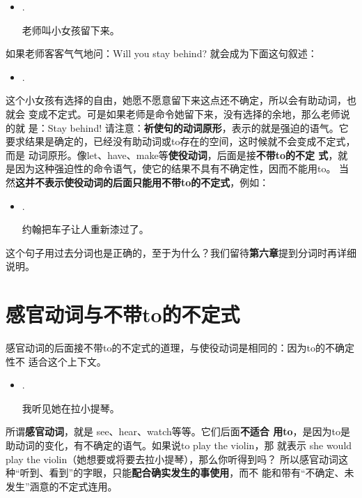 \begin{itemize}
\item  {}   .

  老师叫小女孩留下来。
\end{itemize}

如果老师客客气气地问：Will you stay behind? 就会成为下面这句叙述：
\begin{itemize}
\item {}   .
\end{itemize}
这个小女孩有选择的自由，她愿不愿意留下来这点还不确定，所以会有助动词，也就会
变成不定式。可是如果老师是命令她留下来，没有选择的余地，那么老师说的就
是：Stay behind! 请注意：\textbf{祈使句的动词原形}，表示的就是强迫的语气。它
要求结果是确定的，已经没有助动词或to存在的空间，这时候就不会变成不定式，而是
动词原形。像let、have、make等\textbf{使役动词}，后面是接\textbf{不带to的不定
  式}，就是因为这种强迫性的命令语气，使它的结果不具有不确定性，因而不能用to。
当然\textbf{这并不表示使役动词的后面只能用不带to的不定式}，例如：
\begin{itemize}
\item {}   .

  约翰把车子让人重新漆过了。
\end{itemize}
这个句子用过去分词也是正确的，至于为什么？我们留待\textbf{第六章}提到分词时再详细说明。

\section{感官动词与不带to的不定式}

感官动词的后面接不带to的不定式的道理，与使役动词是相同的：因为to的不确定性不
适合这个上下文。

\begin{itemize}
\item {}   .

  我听见她在拉小提琴。
\end{itemize}

所谓\textbf{感官动词}，就是 see、hear、watch等等。它们后面\textbf{不适合
  用to}，是因为to是助动词的变化，有不确定的语气。如果说to play the violin，那
就表示 she would play the violin（她想要或将要去拉小提琴），那么你听得到吗？
所以感官动词这种“听到、看到”的字眼，只能\textbf{配合确实发生的事使用}，而不
能和带有“不确定、未发生”涵意的不定式连用。

